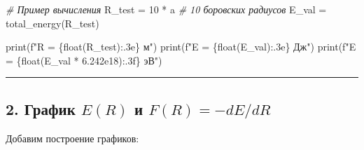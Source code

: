 \documentclass[11pt]{article}
\newenvironment{Shaded}{}{}
\newcommand{\DecValTok}[1]{\textcolor[rgb]{0.25,0.63,0.44}{{#1}}}
\newcommand{\FloatTok}[1]{\textcolor[rgb]{0.25,0.63,0.44}{{#1}}}
\newcommand{\CommentTok}[1]{\textcolor[rgb]{0.38,0.63,0.69}{\textit{{#1}}}}
\newcommand{\NormalTok}[1]{{#1}}
\newcommand{\SpecialCharTok}[1]{\textcolor[rgb]{0.25,0.44,0.63}{{#1}}}
\newcommand{\SpecialStringTok}[1]{\textcolor[rgb]{0.73,0.40,0.53}{{#1}}}
\newcommand{\OperatorTok}[1]{\textcolor[rgb]{0.40,0.40,0.40}{{#1}}}
\newcommand{\BuiltInTok}[1]{{#1}}
\begin{document}
\begin{Shaded}
\begin{Highlighting}[]
\CommentTok{# Пример вычисления}
\NormalTok{R_test }\OperatorTok{=} \DecValTok{10} \OperatorTok{*}\NormalTok{ a  }\CommentTok{# 10 боровских радиусов}
\NormalTok{E_val }\OperatorTok{=}\NormalTok{ total_energy(R_test)}

\BuiltInTok{print}\NormalTok{(}\SpecialStringTok{f"R = }\SpecialCharTok{\{}\BuiltInTok{float}\NormalTok{(R_test)}\SpecialCharTok{:.3e\}}\SpecialStringTok{ м"}\NormalTok{)}
\BuiltInTok{print}\NormalTok{(}\SpecialStringTok{f"E = }\SpecialCharTok{\{}\BuiltInTok{float}\NormalTok{(E_val)}\SpecialCharTok{:.3e\}}\SpecialStringTok{ Дж"}\NormalTok{)}
\BuiltInTok{print}\NormalTok{(}\SpecialStringTok{f"E = }\SpecialCharTok{\{}\BuiltInTok{float}\NormalTok{(E_val }\OperatorTok{*} \FloatTok{6.242e18}\NormalTok{)}\SpecialCharTok{:.3f\}}\SpecialStringTok{ эВ"}\NormalTok{)}
\end{Highlighting}
\end{Shaded}

\begin{center}\rule{0.5\linewidth}{\linethickness}\end{center}

\subsection{\texorpdfstring{2. График \(E(R)\) и
\(F(R) = -dE/dR\)}{2. График E(R) и F(R) = -dE/dR}}\label{ux433ux440ux430ux444ux438ux43a-er-ux438-fr--dedr}

Добавим построение графиков:
\end{document}
